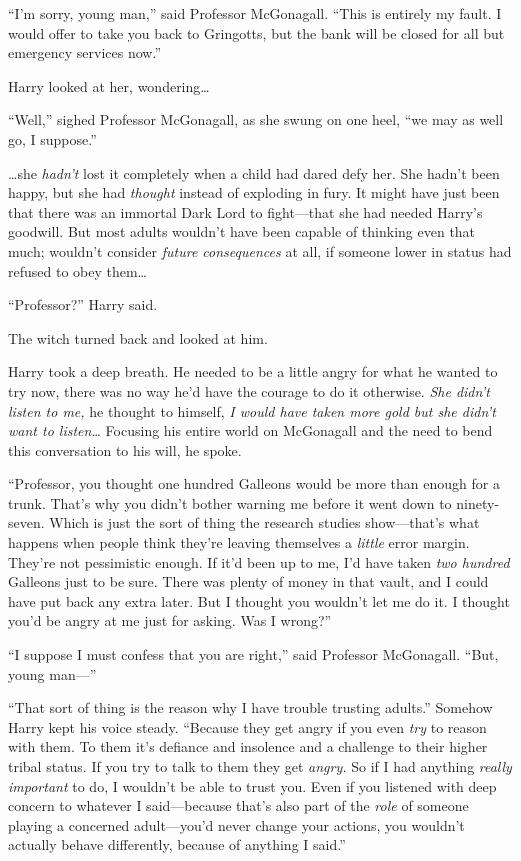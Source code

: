 “I’m sorry, young man,” said Professor McGonagall. “This is entirely my fault. I would offer to take you back to Gringotts, but the bank will be closed for all but emergency services now.”

Harry looked at her, wondering…

“Well,” sighed Professor McGonagall, as she swung on one heel, “we may as well go, I suppose.”

…she \emph{hadn’t} lost it completely when a child had dared defy her. She hadn’t been happy, but she had \emph{thought} instead of exploding in fury. It might have just been that there was an immortal Dark Lord to fight—that she had needed Harry’s goodwill. But most adults wouldn’t have been capable of thinking even that much; wouldn’t consider \emph{future consequences} at all, if someone lower in status had refused to obey them…

“Professor?” Harry said.

The witch turned back and looked at him.

Harry took a deep breath. He needed to be a little angry for what he wanted to try now, there was no way he’d have the courage to do it otherwise. \emph{She didn’t listen to me,} he thought to himself, \emph{I would have taken more gold but she didn’t want to listen…} Focusing his entire world on McGonagall and the need to bend this conversation to his will, he spoke.

“Professor, you thought one hundred Galleons would be more than enough for a trunk. That’s why you didn’t bother warning me before it went down to ninety-seven. Which is just the sort of thing the research studies show—that’s what happens when people think they’re leaving themselves a \emph{little} error margin. They’re not pessimistic enough. If it’d been up to me, I’d have taken \emph{two hundred} Galleons just to be sure. There was plenty of money in that vault, and I could have put back any extra later. But I thought you wouldn’t let me do it. I thought you’d be angry at me just for asking. Was I wrong?”

“I suppose I must confess that you are right,” said Professor McGonagall. “But, young man—”

“That sort of thing is the reason why I have trouble trusting adults.” Somehow Harry kept his voice steady. “Because they get angry if you even \emph{try} to reason with them. To them it’s defiance and insolence and a challenge to their higher tribal status. If you try to talk to them they get \emph{angry.} So if I had anything \emph{really important} to do, I wouldn’t be able to trust you. Even if you listened with deep concern to whatever I said—because that’s also part of the \emph{role} of someone playing a concerned adult—you’d never change your actions, you wouldn’t actually behave differently, because of anything I said.”

